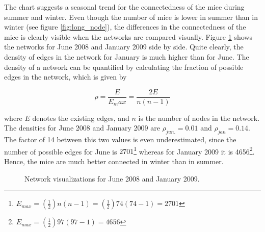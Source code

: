 The chart suggests a seasonal trend for the connectedness of the mice during summer and winter. Even though the number of mice is lower in summer than in winter (see figure \ref{fig:long_node}), the differences in the connectedness of the mice is clearly visible when the networks are compared visually. Figure \ref{fig:june_jan_side} shows the networks for June 2008 and January 2009 side by side. Quite clearly, the density of edges in the network for January is much higher than for June. The density of a network can be quantified by calculating the fraction of possible edges in the network, which is given by 

\begin{equation}
\rho = \frac{E}{E_max} = \frac{2E}{n(n-1)}
\label{eq:density}
\end{equation}      

where $E$ denotes the existing edges, and $n$ is the number of nodes in the network. The densities for June 2008 and January 2009 are $\rho_{jun.} = 0.01$ and $\rho_{jan} = 0.14$. The factor of 14 between this two values is even underestimated, since the number of possible edges for June is $2701$\footnote{$E_{max} = (\frac{1}{2})n(n-1) = (\frac{1}{2}) 74(74 -1) = 2701$} whereas for January 2009 it is 4656\footnote{$E_{max} = (\frac{1}{2}) 97(97-1)  = 4656$}. Hence, the mice are much better connected in winter than in summer.  

\begin{figure}[htpb]%
	\centering 
	
	\qquad 			
	\caption[Network visualizations for June 2008 and January 2009]{Network visualizations for June 2008 and January 2009.}
	 \label{fig:june_jan_side}
\end{figure} 

